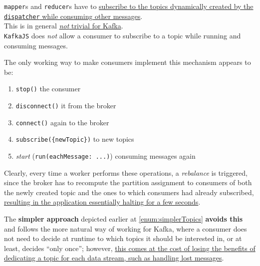 \texttt{mapper}s and \texttt{reducer}s have to \ul{subscribe to the topics dynamically created by the \texttt{dispatcher} while consuming other messages}. \\
This is in general \ul{\textit{not} trivial for Kafka}.\\
\lstinline|KafkaJS| does \textit{not} allow a consumer to subscribe to a topic while running and consuming messages.

{The only working way to make consumers implement this mechanism appears to be:\ns
\begin{enumerate}
   \item \lstinline|stop()| the consumer 
   \item \lstinline|disconnect()| it from the broker
   \item \lstinline|connect()| again to the broker
   \item \lstinline|subscribe({newTopic})| to new topics
   \item \textit{start} (\lstinline|run(eachMessage: ...)|) consuming messages again
\end{enumerate}}

Clearly, every time a worker performs these operations, a \textit{rebalance} is triggered, since the broker has to recompute the partition assignment to consumers of both the newly created topic and the ones to which consumers had already subscribed,
\ul{resulting in the application essentially halting for a few seconds}.

The \textbf{simpler approach} depicted earlier at \ref{enum:simplerTopics} \textbf{avoids this} and follows the more natural way of working for Kafka, where a consumer does not need to decide at runtime to which topics it should be interested in, or at least, decides ``only once'';
however, \ul{this comes at the cost of losing the benefits of dedicating a topic for each data stream, such as handling lost messages}.




